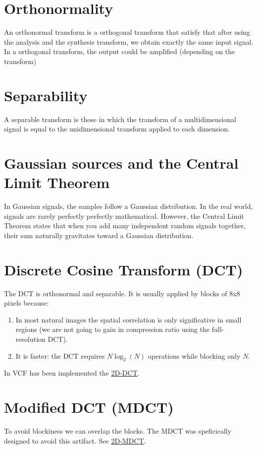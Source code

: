 \section{Orthonormality}
An orthonormal transform is a orthogonal transform that satisfy that
after using the analysis and the synthesis transform, we obtain
exactly the same input signal. In a orthogonal transform, the output
could be amplified (depending on the transform)

\section{Separability}
A separable transform is those in which the transform of a
multidimensional signal is equal to the unidimensional transform
applied to each dimension.

\section{Gaussian sources and the Central Limit Theorem}
In Gaussian signals, the samples follow a Gaussian distribution. In
the real world, signals are rarely perfectly perfectly
mathematical. However, the Central Limit Theorem states that when you
add many independent random signals together, their sum naturally
gravitates toward a Gaussian distribution.

\section{Discrete Cosine Transform (DCT)}
The DCT is orthonormal and separable. It is usually applied by blocks
of 8x8 pixels because:
\begin{enumerate}
\item In most natural images the spatial correlation is only
  significative in small regions (we are not going to gain in
  compression ratio using the full-resolution DCT).
\item It is faster: the DCT requires $N\log_2(N)$ operations while
  blocking only $N$.
\end{enumerate}

In VCF has been implemented the
\href{https://github.com/Sistemas-Multimedia/VCF/blob/main/notebooks/2D-DCT.ipynb}{2D-DCT}.

\section{Modified DCT (MDCT)}
To avoid blockiness we can overlap the blocks. The MDCT was
speficically designed to avoid this artifact. See
\href{https://github.com/Sistemas-Multimedia/VCF/blob/main/notebooks/2D-MDCT.ipynb}{2D-MDCT}.

